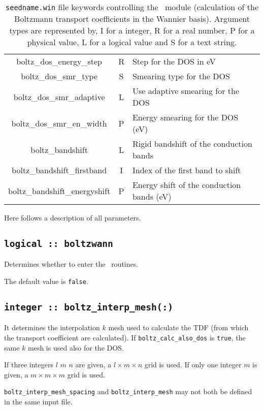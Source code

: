 \begin{table}
\begin{center}
\begin{tabular}{|c|c|p{6cm}|}
{\sc boltz\_dos\_energy\_step} & R & Step for the DOS in eV\\
{\sc boltz\_dos\_smr\_type} & S & Smearing type for the DOS \\
{\sc boltz\_dos\_smr\_adaptive} & L & Use adaptive smearing for the DOS \\
{\sc boltz\_dos\_smr\_en\_width} & P  & Energy smearing for the DOS (eV) \\
{\sc boltz\_bandshift} & L & Rigid bandshift of the conduction bands\\
{\sc boltz\_bandshift\_firstband} & I & Index of the first band to shift\\
{\sc boltz\_bandshift\_energyshift} & P & Energy shift of the conduction bands (eV)\\
\hline
\end{tabular}
\caption[Parameter file keywords controlling the \bw\ module.]
{{\tt seedname.win} file keywords controlling the \bw\ module (calculation of the Boltzmann transport coefficients in the Wannier basis). Argument types
are represented by, I for a integer, R for a real number, P for a
physical value, L for a logical value and S for a text string.}
\label{parameter_keywords_bw}
\end{center}
\end{table}

Here follows a description of all parameters.

\subsection[boltzwann]{\tt logical :: boltzwann}
Determines whether to enter the \bw\ routines.

The default value is \verb#false#.

\subsection[boltz\_interp\_mesh]{\tt integer :: boltz\_interp\_mesh(:)}
It determines the interpolation $k$ mesh used to calculate the TDF (from which the transport coefficient are calculated). If {\tt boltz\_calc\_also\_dos} is \verb#true#, the same $k$ mesh is used also for the DOS.

If three integers $l$ $m$ $n$ are given, a $l\times m\times n$ grid is used. If only one integer $m$ is given, a $m\times m\times m$ grid is used.

{\tt boltz\_interp\_mesh\_spacing} and  {\tt boltz\_interp\_mesh} may not both be defined in the same input file.

